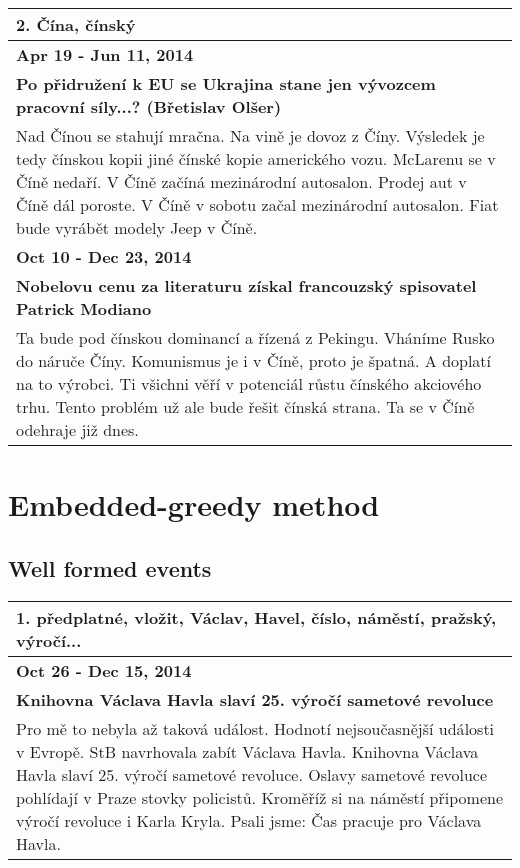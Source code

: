 \hspace{\fill}

\begin{tabularx}{\linewidth}{p{\linewidth}} \toprule[1.5pt]
\bf 2. Čína, čínský \\ \midrule
\bf Apr 19 - Jun 11, 2014 \\ \midrule
\bf Po přidružení k EU se Ukrajina stane jen vývozcem pracovní síly...? (Břetislav Olšer) \\
Nad Čínou se stahují mračna. Na vině je dovoz z Číny. Výsledek je tedy čínskou kopii jiné čínské kopie amerického vozu. McLarenu se v Číně nedaří. V Číně začíná mezinárodní autosalon. Prodej aut v Číně dál poroste. V Číně v sobotu začal mezinárodní autosalon. Fiat bude vyrábět modely Jeep v Číně. \\ \bottomrule[1.25pt]

\bf Oct 10 - Dec 23, 2014 \\ \midrule
\bf Nobelovu cenu za literaturu získal francouzský spisovatel Patrick Modiano \\
Ta bude pod čínskou dominancí a řízená z Pekingu. Vháníme Rusko do náruče Číny. Komunismus je i v Číně, proto je špatná. A doplatí na to výrobci. Ti všichni věří v potenciál růstu čínského akciového trhu. Tento problém už ale bude řešit čínská strana. Ta se v Číně odehraje již dnes. \\ \bottomrule[1.25pt]

\end{tabularx}

\hspace{\fill}


\section{Embedded-greedy method}
\subsection*{Well formed events}
\begin{tabularx}{\linewidth}{p{\linewidth}} \toprule[1.5pt]


\bf 1. předplatné, vložit, Václav, Havel, číslo, náměstí, pražský, výročí... \\ \midrule
\bf Oct 26 - Dec 15, 2014 \\
\bf Knihovna Václava Havla slaví 25. výročí sametové revoluce \\
Pro mě to nebyla až taková událost. Hodnotí nejsoučasnější události v Evropě. StB navrhovala zabít Václava Havla. Knihovna Václava Havla slaví 25. výročí sametové revoluce. Oslavy sametové revoluce pohlídají v Praze stovky policistů. Kroměříž si na náměstí připomene výročí revoluce i Karla Kryla. Psali jsme: Čas pracuje pro Václava Havla. \\ \bottomrule[1.25pt]

\end{tabularx}

